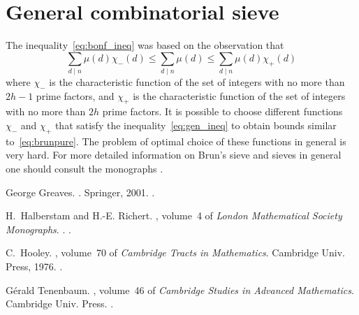 \documentclass[12pt]{article}
\begin{document}
\section*{General combinatorial sieve}
The inequality~\eqref{eq:bonf_ineq} was based on the observation
that
\begin{equation}\label{eq:gen_ineq}
\sum_{d\mid n}\mu(d)\chi_-(d)\leq \sum_{d\mid n} \mu(d)\leq
\sum_{d\mid n}\mu(d)\chi_+(d)
\end{equation}
where $\chi_-$ is the characteristic function of the set of
integers with no more than $2h-1$ prime factors, and $\chi_+$ is
the characteristic function of the set of integers with no more
than $2h$ prime factors. It is possible to choose different
functions $\chi_-$ and $\chi_+$ that satisfy the
inequality~\eqref{eq:gen_ineq} to obtain bounds similar
to~\eqref{eq:brunpure}. The problem of optimal choice of these
functions in general is very hard. For more detailed information
on Brun's sieve and sieves in general one should consult the
monographs
\cite{cite:greaves_sieves,cite:halberstam_richert_sieves,cite:hooley_appsievemethods}.

\begin{thebibliography}{1}

George Greaves.
.
\newblock Springer, 2001.
\newblock {}.

H.~Halberstam and H.-E. Richert.
, volume~4 of {\em London Mathematical Society
  Monographs}.
.
\newblock {}.

C.~Hooley.
,
  volume~70 of {\em Cambridge Tracts in Mathematics}.
\newblock Cambridge Univ. Press, 1976.
\newblock {}.

G{\'e}rald Tenenbaum.
,
  volume~46 of {\em Cambridge Studies in Advanced Mathematics}.
\newblock Cambridge Univ. Press.
\newblock {}.

\end{thebibliography}
\end{document}
